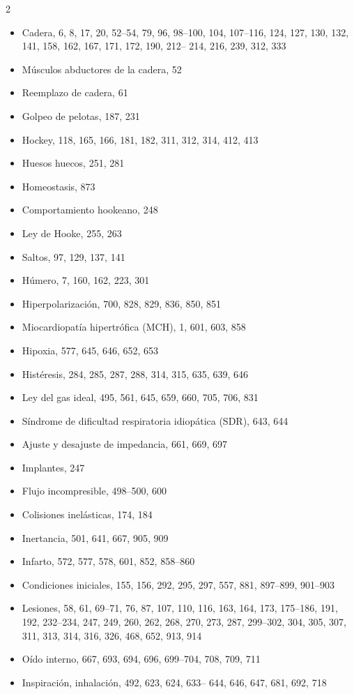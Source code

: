 \documentclass[12pt,a4paper]{book}
\begin{document}
\begin{multicols}{2}
\begin{itemize}[leftmargin=*]
  \item Cadera, 6, 8, 17, 20, 52--54, 79, 96, 98--100, 104, 107--116, 124, 127, 130, 132, 141, 158, 162, 167, 171, 172, 190, 212-- 214, 216, 239, 312, 333
  \item Músculos abductores de la cadera, 52
  \item Reemplazo de cadera, 61
  \item Golpeo de pelotas, 187, 231
  \item Hockey, 118, 165, 166, 181, 182, 311, 312, 314, 412, 413
  \item Huesos huecos, 251, 281
  \item Homeostasis, 873
  \item Comportamiento hookeano, 248
  \item Ley de Hooke, 255, 263
  \item Saltos, 97, 129, 137, 141
  \item Húmero, 7, 160, 162, 223, 301
  \item Hiperpolarización, 700, 828, 829, 836, 850, 851
  \item Miocardiopatía hipertrófica (MCH), 1, 601, 603, 858
  \item Hipoxia, 577, 645, 646, 652, 653
  \item Histéresis, 284, 285, 287, 288, 314, 315, 635, 639, 646
  \item Ley del gas ideal, 495, 561, 645, 659, 660, 705, 706, 831
  \item Síndrome de dificultad respiratoria idiopática (SDR), 643, 644
  \item Ajuste y desajuste de impedancia, 661, 669, 697
  \item Implantes, 247
  \item Flujo incompresible, 498--500, 600
  \item Colisiones inelásticas, 174, 184
  \item Inertancia, 501, 641, 667, 905, 909
  \item Infarto, 572, 577, 578, 601, 852, 858--860
  \item Condiciones iniciales, 155, 156, 292, 295, 297, 557, 881, 897--899, 901--903
  \item Lesiones, 58, 61, 69--71, 76, 87, 107, 110, 116, 163, 164, 173, 175--186, 191, 192, 232--234, 247, 249, 260, 262, 268, 270, 273, 287, 299--302, 304, 305, 307, 311, 313, 314, 316, 326, 468, 652, 913, 914
  \item Oído interno, 667, 693, 694, 696, 699--704, 708, 709, 711
  \item Inspiración, inhalación, 492, 623, 624, 633-- 644, 646, 647, 681, 692, 718

\end{itemize}
\end{multicols}
\end{document}
